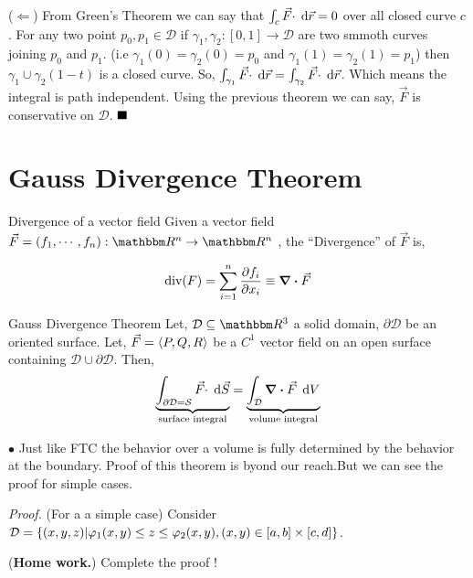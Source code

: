 \documentclass[../Analysis-3]{subfiles}
\begin{document}
($\Leftarrow$) From Green's Theorem we can say that $ \int_{c} {\vec{F} \cdot } \hspace{0.1cm} \dd {\vec{r}} = 0$ over all closed curve $c$. For any two point $p_0,p_1 \in \mathcal{D}$ if $\gamma_1, \gamma_2 : [0,1] \to \mathcal{D}$ are two smmoth curves joining $p_0$ and $p_1$. (i.e $\gamma_1(0) = \gamma_2 (0) = p_0$ and $\gamma_1(1) = \gamma_2(1) = p_1$) then $\gamma_1 \cup \gamma_2(1-t)$ is a closed curve. So, $ \int_{\gamma_1} {\vec{F} \cdot } \hspace{0.1cm} \dd {\vec{r}}  = \int_{\gamma_2} {\vec{F} \cdot } \hspace{0.1cm} \dd {\vec{r}}$. Which means the integral is path independent. Using the previous theorem we can say, $\vec{F}$ is conservative on $\mathcal{D}$. $\hfill \blacksquare$

\section{Gauss Divergence Theorem}

\begin{Def}{Divergence of a vector field}{}
    \small  Given a vector field $\vec{F} = (f_1,\cdots, f_n) : \R^n \to \R^n $ , the ``Divergence'' of $\vec{F}$ is,

    \[\text{div}(F) = \sum_{i=1}^{n} \pdv{f_i}{x_i} \equiv \div \vec{F}\]
\end{Def}

\begin{Thm}{Gauss Divergence Theorem}{}\label{GDT:1}
    Let, $\mathcal{D} \subseteq \R^3$ a solid domain, $\partial{\mathcal{D}}$ be an oriented surface. Let,  $\vec{F} = \left\langle {P}, {Q,R} \right\rangle$ be a $C^1$ vector field on an open surface containing $\mathcal{D} \cup \partial{\mathcal{D}}$. Then,
    \[
        \underbrace{\int_{\partial{\mathcal{D}} = \mathcal{S}} {\vec{F}\cdot} \hspace{0.1cm} \dd {\vec{S}}}_\text{surface integral} = \underbrace{\int_{\mathcal{D}} {\div \vec{F}} \hspace{0.1cm} \dd {V}}_\text{volume integral}
    \]
\end{Thm}

$ \bullet $ Just like FTC the behavior over a volume is fully determined by the behavior at the boundary. Proof of this theorem is byond our reach.But we can see the proof for simple cases.

\vspace{0.2cm}

\textit{Proof.} (For a a simple case) Consider $\mathcal{D} = \qty{(x,y,z) | \varphi_1(x,y) \le z \le \varphi_2(x,y) , (x,y) \in [a,b]\times [c,d]}$.

(\textbf{Home work.}) Complete the proof !

\end{document}
